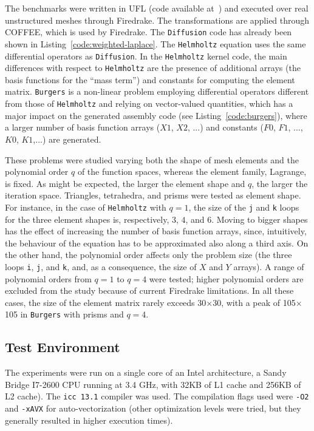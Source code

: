 The benchmarks were written in UFL (code available at~\citep{ufl-code-lowlevelopt}) and executed over real unstructured meshes through Firedrake. The transformations are applied through COFFEE, which is used by Firedrake. The {\tt Diffusion} code has already been shown in Listing~\ref{code:weighted-laplace}. The {\tt Helmholtz} equation uses the same differential operators as {\tt Diffusion}. In the {\tt Helmholtz} kernel code, the main differences with respect to {\tt Helmholtz} are the presence of additional arrays (the basis functions for the ``mass term'') and constants for computing the element matrix. {\tt Burgers} is a non-linear problem employing differential operators different from those of {\tt Helmholtz} and relying on vector-valued quantities, which has a major impact on the generated assembly code (see Listing~\ref{code:burgers}), where a larger number of basis function arrays ($X1$, $X2$, ...) and constants ($F0$, $F1$, ..., $K0$, $K1$,...) are generated.

These problems were studied varying both the shape of mesh elements and the polynomial order $q$ of the function spaces, whereas the element family, Lagrange, is fixed. As might be expected, the larger the element shape and $q$, the larger the iteration space. Triangles, tetrahedra, and prisms were tested as element shape. For instance, in the case of {\tt Helmholtz} with $q=1$, the size of the \texttt{j} and \texttt{k} loops for the three element shapes is, respectively, $3$, $4$, and $6$. Moving to bigger shapes has the effect of increasing the number of basis function arrays, since, intuitively, the behaviour of the equation has to be approximated also along a third axis. On the other hand, the polynomial order affects only the problem size (the three loops \texttt{i}, \texttt{j}, and \texttt{k}, and, as a consequence, the size of $X$ and $Y$ arrays). A range of polynomial orders from $q=1$ to $q=4$ were tested; higher polynomial orders are excluded from the study because of current Firedrake limitations. In all these cases, the size of the element matrix rarely exceeds 30$\times$30, with a peak of 105$\times$105 in {\tt Burgers} with prisms and $q=4$.

\subsection{Test Environment}
The experiments were run on a single core of an Intel architecture, a Sandy Bridge I7-2600 CPU running at 3.4 GHz, with 32KB of L1 cache and 256KB of L2 cache). The \texttt{icc 13.1} compiler was used. The compilation flags used were \texttt{-O2} and \texttt{-xAVX} for auto-vectorization (other optimization levels were tried, but they generally resulted in higher execution times). 

